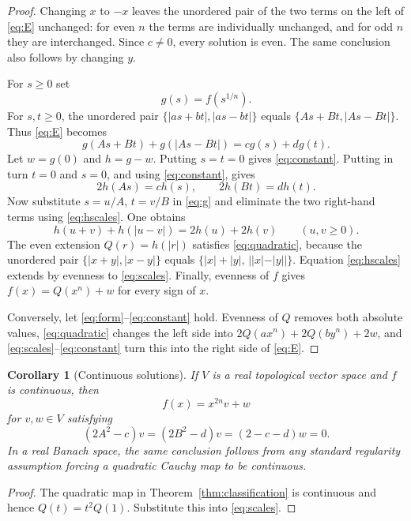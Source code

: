 \documentclass[11pt]{article}
\newtheorem{corollary}[theorem]{Corollary}
\newcommand{\abs}[1]{\left|#1\right|}
\begin{document}
\begin{proof}
Changing $x$ to $-x$ leaves the unordered pair of the two terms on the
left of \eqref{eq:E} unchanged: for even $n$ the terms are individually
unchanged, and for odd $n$ they are interchanged.  Since $c\ne0$, every
solution is even.  The same conclusion also follows by changing $y$.

For $s\geq0$ set
\[
 g(s)=f(s^{1/n}).
\]
For $s,t\geq0$, the unordered pair
$\{\abs{as+bt},\abs{as-bt}\}$ equals
$\{As+Bt,\abs{As-Bt}\}$.  Thus \eqref{eq:E} becomes
\begin{equation}\label{eq:g}
 g(As+Bt)+g(\abs{As-Bt})=cg(s)+dg(t).
\end{equation}
Let $w=g(0)$ and $h=g-w$.  Putting $s=t=0$ gives
\eqref{eq:constant}.  Putting in turn $t=0$ and $s=0$, and using
\eqref{eq:constant}, gives
\begin{equation}\label{eq:hscales}
 2h(As)=ch(s),\qquad 2h(Bt)=dh(t).
\end{equation}
Now substitute $s=u/A$, $t=v/B$ in \eqref{eq:g} and eliminate the two
right-hand terms using \eqref{eq:hscales}.  One obtains
\begin{equation}\label{eq:halfquad}
 h(u+v)+h(\abs{u-v})=2h(u)+2h(v)\qquad(u,v\geq0).
\end{equation}
The even extension $Q(r)=h(|r|)$ satisfies \eqref{eq:quadratic}, because
the unordered pair $\{|x+y|,|x-y|\}$ equals
$\{|x|+|y|,\,||x|-|y||\}$.  Equation \eqref{eq:hscales} extends by
evenness to \eqref{eq:scales}.  Finally, evenness of $f$ gives
$f(x)=Q(x^n)+w$ for every sign of $x$.

Conversely, let \eqref{eq:form}--\eqref{eq:constant} hold.  Evenness of
$Q$ removes both absolute values, \eqref{eq:quadratic} changes the left
side into
$2Q(ax^n)+2Q(by^n)+2w$, and \eqref{eq:scales}--\eqref{eq:constant}
turn this into the right side of \eqref{eq:E}.
\end{proof}

\begin{corollary}[Continuous solutions]\label{cor:continuous}
If $V$ is a real topological vector space and $f$ is continuous, then
\[
 f(x)=x^{2n}v+w
\]
for $v,w\in V$ satisfying
\[
 (2A^2-c)v=(2B^2-d)v=(2-c-d)w=0.
\]
In a real Banach space, the same conclusion follows from any standard
regularity assumption forcing a quadratic Cauchy map to be continuous.
\end{corollary}

\begin{proof}
The quadratic map in Theorem~\ref{thm:classification} is continuous and
hence $Q(t)=t^2Q(1)$.  Substitute this into \eqref{eq:scales}.
\end{proof}
\end{document}
